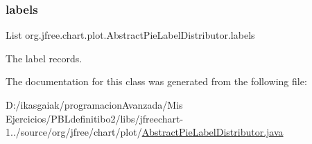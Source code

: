 \subsubsection{\texorpdfstring{labels}{labels}}
{\footnotesize\ttfamily List org.\+jfree.\+chart.\+plot.\+Abstract\+Pie\+Label\+Distributor.\+labels\hspace{0.3cm}{\ttfamily [protected]}}

The label records. 

The documentation for this class was generated from the following file\+:\begin{DoxyCompactItemize}
\item 
D\+:/ikasgaiak/programacion\+Avanzada/\+Mis Ejercicios/\+P\+B\+Ldefinitibo2/libs/jfreechart-\/1../source/org/jfree/chart/plot/\mbox{\hyperlink{_abstract_pie_label_distributor_8java}{Abstract\+Pie\+Label\+Distributor.\+java}}\end{DoxyCompactItemize}
